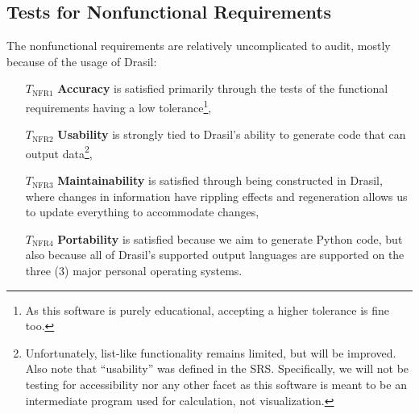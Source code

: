 \documentclass[12pt, titlepage]{article}
\begin{document}
\begin{landscape}
\begin{longtable}[c]{|l|ccc|c|l|}

    \end{longtable}
\end{landscape}

\subsection{Tests for Nonfunctional Requirements}

The nonfunctional requirements are relatively uncomplicated to audit, mostly
because of the usage of Drasil:

\begin{enumerate}

    \item[$T_\text{NFR1}$] \textbf{Accuracy} is satisfied primarily through the
        tests of the functional requirements having a low
        tolerance\footnote{As this software is purely educational,
            accepting a higher tolerance is fine too.},

    \item[$T_\text{NFR2}$] \textbf{Usability} is strongly tied to Drasil's
        ability to generate code that can output
        data\footnote{Unfortunately, list-like functionality remains
            limited, but will be improved. Also note that ``usability'' was
            defined in the SRS. Specifically, we will not be testing for
            accessibility nor any other facet as this software is meant to
            be an intermediate program used for calculation, not
            visualization.},

    \item[$T_\text{NFR3}$] \textbf{Maintainability} is satisfied through being
        constructed in Drasil, where changes in information have
        rippling effects and regeneration allows us to update everything
        to accommodate changes,

    \item[$T_\text{NFR4}$] \textbf{Portability} is satisfied because we aim to
        generate Python code, but also because all of Drasil's supported
        output languages are supported on the three (3) major personal
        operating systems.

\end{enumerate}
\end{document}
